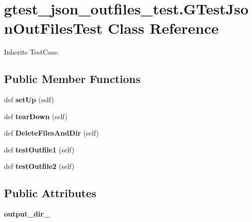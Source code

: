 \hypertarget{classgtest__json__outfiles__test_1_1GTestJsonOutFilesTest}{}\section{gtest\+\_\+json\+\_\+outfiles\+\_\+test.\+G\+Test\+Json\+Out\+Files\+Test Class Reference}
\label{classgtest__json__outfiles__test_1_1GTestJsonOutFilesTest}


Inherits Test\+Case.

\subsection*{Public Member Functions}
\begin{DoxyCompactItemize}
\item 
\mbox{\label{classgtest__json__outfiles__test_1_1GTestJsonOutFilesTest_a7963f08a9b027152cfc2dc2acae0dbb8}} 
def {\bfseries set\+Up} (self)
\item 
\mbox{\label{classgtest__json__outfiles__test_1_1GTestJsonOutFilesTest_a42e794bfad0ae9f623cb7386cfda624f}} 
def {\bfseries tear\+Down} (self)
\item 
\mbox{\label{classgtest__json__outfiles__test_1_1GTestJsonOutFilesTest_a0dc312861e1f354abc8dbd6fdcb215ba}} 
def {\bfseries Delete\+Files\+And\+Dir} (self)
\item 
\mbox{\label{classgtest__json__outfiles__test_1_1GTestJsonOutFilesTest_a1826f389f67749b50fc4541e6f56e3be}} 
def {\bfseries test\+Outfile1} (self)
\item 
\mbox{\label{classgtest__json__outfiles__test_1_1GTestJsonOutFilesTest_aef52741ca6fc413c3d6d507377869188}} 
def {\bfseries test\+Outfile2} (self)
\end{DoxyCompactItemize}
\subsection*{Public Attributes}
\begin{DoxyCompactItemize}
\item 
\mbox{\label{classgtest__json__outfiles__test_1_1GTestJsonOutFilesTest_a2cf3bfa4f7cdc1d002e7697805070e04}} 
{\bfseries output\+\_\+dir\+\_\+}
\end{DoxyCompactItemize}


